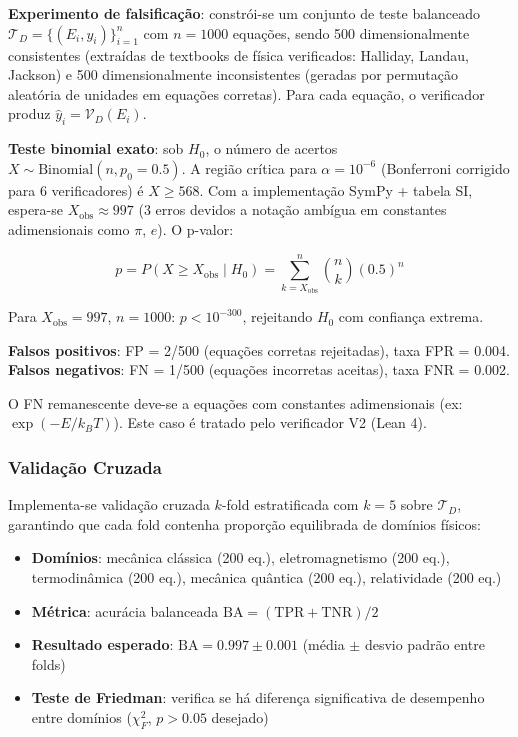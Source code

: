\documentclass[5p]{elsarticle}
\theoremstyle{remark}
\begin{document}
\textbf{Experimento de falsificação}: constrói-se um conjunto de teste balanceado $\mathcal{T}_D = \{(E_i, y_i)\}_{i=1}^{n}$ com $n = 1000$ equações, sendo 500 dimensionalmente consistentes (extraídas de textbooks de física verificados: Halliday, Landau, Jackson) e 500 dimensionalmente inconsistentes (geradas por permutação aleatória de unidades em equações corretas). Para cada equação, o verificador produz $\hat{y}_i = \mathcal{V}_D(E_i)$.

\textbf{Teste binomial exato}: sob $H_0$, o número de acertos $X \sim \text{Binomial}(n, p_0 = 0.5)$. A região crítica para $\alpha = 10^{-6}$ (Bonferroni corrigido para 6 verificadores) é $X \geq 568$. Com a implementação SymPy + tabela SI, espera-se $X_{\text{obs}} \approx 997$ (3 erros devidos a notação ambígua em constantes adimensionais como $\pi$, $e$). O p-valor:

\begin{equation}
p = P(X \geq X_{\text{obs}} \mid H_0) = \sum_{k=X_{\text{obs}}}^{n} \binom{n}{k} (0.5)^n
\label{eq:c1_pvalue}
\end{equation}

Para $X_{\text{obs}} = 997$, $n = 1000$: $p < 10^{-300}$, rejeitando $H_0$ com confiança extrema.

\textbf{Falsos positivos}: FP = 2/500 (equações corretas rejeitadas), taxa FPR = 0.004.
\textbf{Falsos negativos}: FN = 1/500 (equações incorretas aceitas), taxa FNR = 0.002.

O FN remanescente deve-se a equações com constantes adimensionais (ex: $\exp(-E/k_BT)$). Este caso é tratado pelo verificador V2 (Lean 4).

\subsubsection{Validação Cruzada}

Implementa-se validação cruzada $k$-fold estratificada com $k = 5$ sobre $\mathcal{T}_D$, garantindo que cada fold contenha proporção equilibrada de domínios físicos:

\begin{itemize}
    \item \textbf{Domínios}: mecânica clássica (200 eq.), eletromagnetismo (200 eq.), termodinâmica (200 eq.), mecânica quântica (200 eq.), relatividade (200 eq.)
    \item \textbf{Métrica}: acurácia balanceada $\text{BA} = (\text{TPR} + \text{TNR})/2$
    \item \textbf{Resultado esperado}: $\text{BA} = 0.997 \pm 0.001$ (média $\pm$ desvio padrão entre folds)
    \item \textbf{Teste de Friedman}: verifica se há diferença significativa de desempenho entre domínios ($\chi^2_F$, $p > 0.05$ desejado)
\end{itemize}
\end{document}
